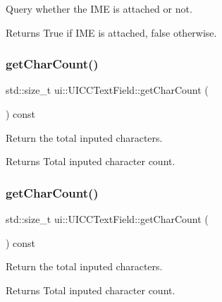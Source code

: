 Query whether the I\+ME is attached or not. 

\begin{DoxyReturn}{Returns}
True if I\+ME is attached, false otherwise. 
\end{DoxyReturn}
\mbox{\label{classui_1_1UICCTextField_a2f8ba9d180b639dc4e4b77e1e052aecb}} 
\subsubsection{\texorpdfstring{get\+Char\+Count()}{getCharCount()}\hspace{0.1cm}{\footnotesize\ttfamily [1/2]}}
{\footnotesize\ttfamily std\+::size\+\_\+t ui\+::\+U\+I\+C\+C\+Text\+Field\+::get\+Char\+Count (\begin{DoxyParamCaption}{ }\end{DoxyParamCaption}) const}

Return the total inputed characters. \begin{DoxyReturn}{Returns}
Total inputed character count. 
\end{DoxyReturn}
\mbox{\label{classui_1_1UICCTextField_a2f8ba9d180b639dc4e4b77e1e052aecb}} 
\subsubsection{\texorpdfstring{get\+Char\+Count()}{getCharCount()}\hspace{0.1cm}{\footnotesize\ttfamily [2/2]}}
{\footnotesize\ttfamily std\+::size\+\_\+t ui\+::\+U\+I\+C\+C\+Text\+Field\+::get\+Char\+Count (\begin{DoxyParamCaption}{ }\end{DoxyParamCaption}) const}

Return the total inputed characters. \begin{DoxyReturn}{Returns}
Total inputed character count. 
\end{DoxyReturn}
\mbox{\label{classui_1_1UICCTextField_a1fa647f6e2272f11dfb6d1a5bb1e2b7c}} 
